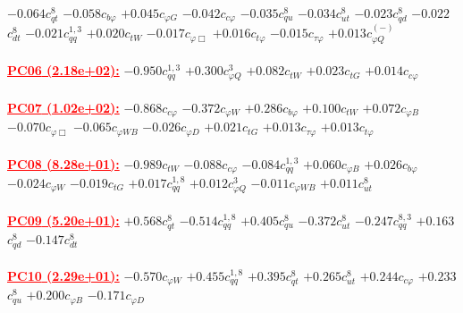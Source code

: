 \documentclass{article}
\begin{document}
{$-0.064$}{\rm $c_{qt}^{8}$} 
{$-0.058$}{\rm $c_{b \varphi}$} 
{$+0.045$}{\rm $c_{\varphi G}$} 
{$-0.042$}{\rm $c_{c \varphi}$} 
{$-0.035$}{\rm $c_{qu}^{8}$} 
{$-0.034$}{\rm $c_{ut}^{8}$} 
{$-0.023$}{\rm $c_{qd}^{8}$} 
{$-0.022$}{\rm $c_{dt}^{8}$} 
{$-0.021$}{\rm $c_{qq}^{1,3}$} 
{$+0.020$}{\rm $c_{tW}$} 
{$-0.017$}{\rm $c_{\varphi \Box}$} 
{$+0.016$}{\rm $c_{t \varphi}$} 
{$-0.015$}{\rm $c_{\tau \varphi}$} 
{$+0.013$}{\rm $c_{\varphi Q}^{(-)}$} 
 \nonumber \\ \nonumber \\ 
\noindent \textcolor{red}{\underline{\bf{PC06} (2.18e+02):}}
{$-0.950$}{\rm $c_{qq}^{1,3}$} 
{$+0.300$}{\rm $c_{\varphi Q}^{3}$} 
{$+0.082$}{\rm $c_{tW}$} 
{$+0.023$}{\rm $c_{tG}$} 
{$+0.014$}{\rm $c_{c \varphi}$} 
 \nonumber \\ \nonumber \\ 
\noindent \textcolor{red}{\underline{\bf{PC07} (1.02e+02):}}
{$-0.868$}{\rm $c_{c \varphi}$} 
{$-0.372$}{\rm $c_{\varphi W}$} 
{$+0.286$}{\rm $c_{b \varphi}$} 
{$+0.100$}{\rm $c_{tW}$} 
{$+0.072$}{\rm $c_{\varphi B}$} 
{$-0.070$}{\rm $c_{\varphi \Box}$} 
{$-0.065$}{\rm $c_{\varphi WB}$} 
{$-0.026$}{\rm $c_{\varphi D}$} 
{$+0.021$}{\rm $c_{tG}$} 
{$+0.013$}{\rm $c_{\tau \varphi}$} 
{$+0.013$}{\rm $c_{t \varphi}$} 
 \nonumber \\ \nonumber \\ 
\noindent \textcolor{red}{\underline{\bf{PC08} (8.28e+01):}}
{$-0.989$}{\rm $c_{tW}$} 
{$-0.088$}{\rm $c_{c \varphi}$} 
{$-0.084$}{\rm $c_{qq}^{1,3}$} 
{$+0.060$}{\rm $c_{\varphi B}$} 
{$+0.026$}{\rm $c_{b \varphi}$} 
{$-0.024$}{\rm $c_{\varphi W}$} 
{$-0.019$}{\rm $c_{tG}$} 
{$+0.017$}{\rm $c_{qq}^{1,8}$} 
{$+0.012$}{\rm $c_{\varphi Q}^{3}$} 
{$-0.011$}{\rm $c_{\varphi WB}$} 
{$+0.011$}{\rm $c_{ut}^{8}$} 
 \nonumber \\ \nonumber \\ 
\noindent \textcolor{red}{\underline{\bf{PC09} (5.20e+01):}}
{$+0.568$}{\rm $c_{qt}^{8}$} 
{$-0.514$}{\rm $c_{qq}^{1,8}$} 
{$+0.405$}{\rm $c_{qu}^{8}$} 
{$-0.372$}{\rm $c_{ut}^{8}$} 
{$-0.247$}{\rm $c_{qq}^{8,3}$} 
{$+0.163$}{\rm $c_{qd}^{8}$} 
{$-0.147$}{\rm $c_{dt}^{8}$} 
 \nonumber \\ \nonumber \\ 
\noindent \textcolor{red}{\underline{\bf{PC10} (2.29e+01):}}
{$-0.570$}{\rm $c_{\varphi W}$} 
{$+0.455$}{\rm $c_{qq}^{1,8}$} 
{$+0.395$}{\rm $c_{qt}^{8}$} 
{$+0.265$}{\rm $c_{ut}^{8}$} 
{$+0.244$}{\rm $c_{c \varphi}$} 
{$+0.233$}{\rm $c_{qu}^{8}$} 
{$+0.200$}{\rm $c_{\varphi B}$} 
{$-0.171$}{\rm $c_{\varphi D}$} 
\end{document}
